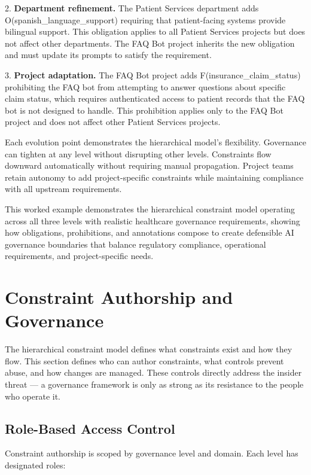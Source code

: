2. \textbf{Department refinement.} The Patient Services department adds O(spanish\_\allowbreak{}language\_\allowbreak{}support) requiring that patient-facing systems provide bilingual support. This obligation applies to all Patient Services projects but does not affect other departments. The FAQ Bot project inherits the new obligation and must update its prompts to satisfy the requirement.

3. \textbf{Project adaptation.} The FAQ Bot project adds F(insurance\_\allowbreak{}claim\_\allowbreak{}status) prohibiting the FAQ bot from attempting to answer questions about specific claim status, which requires authenticated access to patient records that the FAQ bot is not designed to handle. This prohibition applies only to the FAQ Bot project and does not affect other Patient Services projects.

Each evolution point demonstrates the hierarchical model's flexibility. Governance can tighten at any level without disrupting other levels. Constraints flow downward automatically without requiring manual propagation. Project teams retain autonomy to add project-specific constraints while maintaining compliance with all upstream requirements.

This worked example demonstrates the hierarchical constraint model operating across all three levels with realistic healthcare governance requirements, showing how obligations, prohibitions, and annotations compose to create defensible AI governance boundaries that balance regulatory compliance, operational requirements, and project-specific needs.



\section{Constraint Authorship and Governance}
\label{sec:prompt-4}


The hierarchical constraint model defines what constraints exist and how they flow. This section defines who can author constraints, what controls prevent abuse, and how changes are managed. These controls directly address the insider threat --- a governance framework is only as strong as its resistance to the people who operate it.

\subsection{Role-Based Access Control}


Constraint authorship is scoped by governance level and domain. Each level has designated roles:

